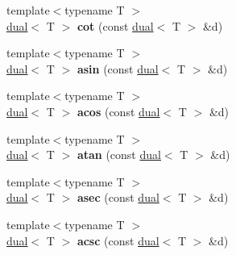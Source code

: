 \begin{DoxyCompactItemize}
\item 
\hypertarget{namespace_d_r_d_s_p_a14cafc80edc330cd57d33e3e2854ed35}{{\footnotesize template$<$typename T $>$ }\\\hyperlink{struct_d_r_d_s_p_1_1dual}{dual}$<$ T $>$ {\bfseries cot} (const \hyperlink{struct_d_r_d_s_p_1_1dual}{dual}$<$ T $>$ \&d)}\label{namespace_d_r_d_s_p_a14cafc80edc330cd57d33e3e2854ed35}

\item 
\hypertarget{namespace_d_r_d_s_p_ac360d99ce5838c1ab94c865dadc1637f}{{\footnotesize template$<$typename T $>$ }\\\hyperlink{struct_d_r_d_s_p_1_1dual}{dual}$<$ T $>$ {\bfseries asin} (const \hyperlink{struct_d_r_d_s_p_1_1dual}{dual}$<$ T $>$ \&d)}\label{namespace_d_r_d_s_p_ac360d99ce5838c1ab94c865dadc1637f}

\item 
\hypertarget{namespace_d_r_d_s_p_a1e41ca6ff603f760d2fa57710bf288b0}{{\footnotesize template$<$typename T $>$ }\\\hyperlink{struct_d_r_d_s_p_1_1dual}{dual}$<$ T $>$ {\bfseries acos} (const \hyperlink{struct_d_r_d_s_p_1_1dual}{dual}$<$ T $>$ \&d)}\label{namespace_d_r_d_s_p_a1e41ca6ff603f760d2fa57710bf288b0}

\item 
\hypertarget{namespace_d_r_d_s_p_ae8517951e5431980f4a31dd17f08e068}{{\footnotesize template$<$typename T $>$ }\\\hyperlink{struct_d_r_d_s_p_1_1dual}{dual}$<$ T $>$ {\bfseries atan} (const \hyperlink{struct_d_r_d_s_p_1_1dual}{dual}$<$ T $>$ \&d)}\label{namespace_d_r_d_s_p_ae8517951e5431980f4a31dd17f08e068}

\item 
\hypertarget{namespace_d_r_d_s_p_ad87a9540922401a52a9307096773ef75}{{\footnotesize template$<$typename T $>$ }\\\hyperlink{struct_d_r_d_s_p_1_1dual}{dual}$<$ T $>$ {\bfseries asec} (const \hyperlink{struct_d_r_d_s_p_1_1dual}{dual}$<$ T $>$ \&d)}\label{namespace_d_r_d_s_p_ad87a9540922401a52a9307096773ef75}

\item 
\hypertarget{namespace_d_r_d_s_p_a2f59e291a569c6ebf5031dd28e638dca}{{\footnotesize template$<$typename T $>$ }\\\hyperlink{struct_d_r_d_s_p_1_1dual}{dual}$<$ T $>$ {\bfseries acsc} (const \hyperlink{struct_d_r_d_s_p_1_1dual}{dual}$<$ T $>$ \&d)}\label{namespace_d_r_d_s_p_a2f59e291a569c6ebf5031dd28e638dca}


\end{DoxyCompactItemize}

